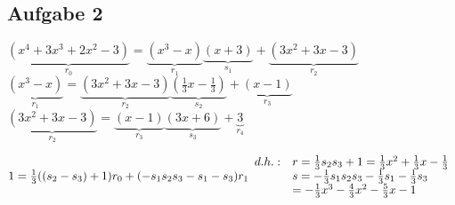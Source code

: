 \documentclass[a4paper,twoside,DIV15,BCOR12mm]{scrbook}
\begin{document}
\subsection{Aufgabe 2}
$\underbrace{(x^4+3x^3+2x^2-3)}_{r_0}=\underbrace{(x^3-x)}_{r_1}\underbrace{(x+3)}_{s_1}+\underbrace{(3x^2+3x-3)}_{r_2}$\\
$\underbrace{(x^3-x)}_{r_1}=\underbrace{(3x^2+3x-3)}_{r_2}\underbrace{(\frac13x-\frac13)}_{s_2}+\underbrace{(x-1)}_{r_3}$\\
$\underbrace{(3x^2+3x-3)}_{r_2}=\underbrace{(x-1)}_{r_3}\underbrace{(3x+6)}_{s_3}+\underbrace{3}_{r_4}$\par
$1=\frac13((s_2-s_3)+1)r_0+(-s_1s_2s_3-s_1-s_3)r_1\\
\begin{array}{ll}d.h.:& r=\frac13s_2s_3+1=\frac13x^2+\frac13x-\frac13\\
& s=-\frac13s_1s_2s_3-\frac13s_1-\frac13s_3\\
& = -\frac13x^3-\frac43x^2-\frac53x-1
\end{array}$
\end{document}
